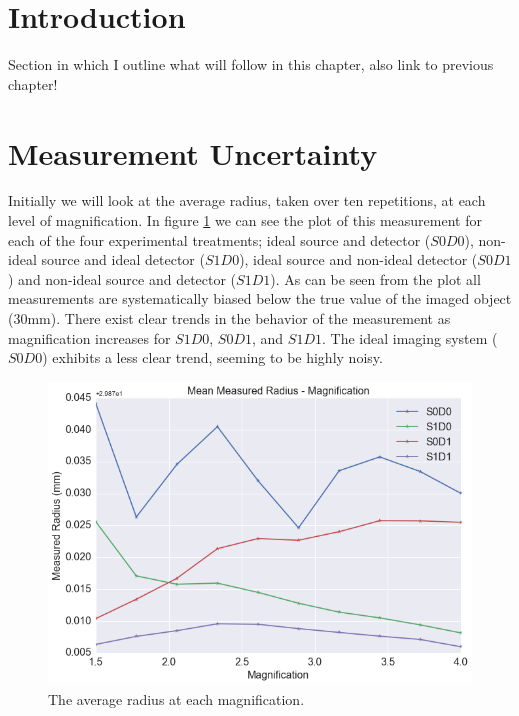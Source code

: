 \documentclass[
  twoside,
  11pt, a4paper,
  footinclude=true,
  headinclude=true,
  cleardoublepage=empty
]{scrbook}
\begin{document}
\section{Introduction}

Section in which I outline what will follow in this chapter, also link to previous chapter!

\section{Measurement Uncertainty}

Initially we will look at the average radius, taken over ten repetitions, at each level of magnification. In figure \ref{avgmeasuredradius} we can see the plot of this measurement for each of the four experimental treatments; ideal source and detector ($S0D0$), non-ideal source and ideal detector ($S1D0$), ideal source and non-ideal detector ($S0D1$) and non-ideal source and detector ($S1D1$). As can be seen from the plot all measurements are systematically biased below the true value of the imaged object (30mm). There exist clear trends in the behavior of the measurement as magnification increases for $S1D0$, $S0D1$, and $S1D1$. The ideal imaging system ($S0D0$) exhibits a less clear trend, seeming to be highly noisy.

\begin{figure}[h!]
  \centering
    \includegraphics[width=\textwidth]{code/RadiusMeasurements/Plots_RadiusCentre_files/Plots_RadiusCentre_4_0.png}
    \caption{The average radius at each magnification.}
    \label{avgmeasuredradius}
\end{figure}
\end{document}
